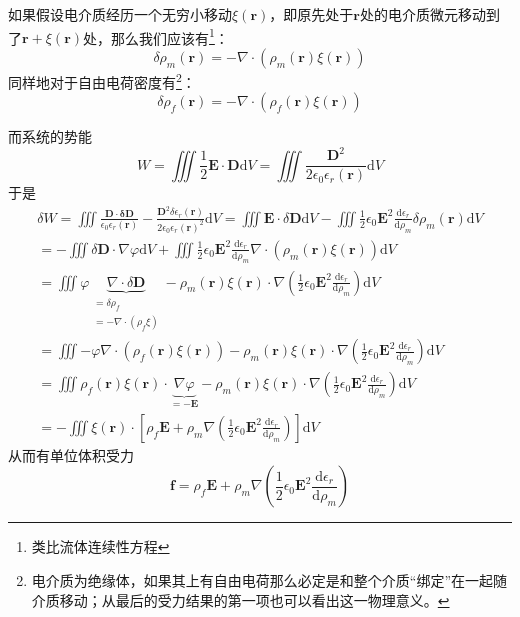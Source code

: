 \documentclass{ctexart}
\newcommand{\epsz}{\epsilon_0}
\newcommand{\epsr}{\epsilon_r}
\newcommand{\bfr}{\mathbf r}
\newcommand{\epsrr}{\epsr(\bfr)}
\newcommand{\epszr}{\epsz\epsrr}
\newcommand{\dd}[2]{\frac{\mathrm d #1}{\mathrm d #2}}
\begin{document}
	如果假设电介质经历一个无穷小移动$\xi(\mathbf r)$，即原先处于$\mathbf r$处的电介质微元移动到了$\mathbf r+\xi(\mathbf r)$处，那么我们应该有\footnote{类比流体连续性方程}：
	\begin{equation}
	\delta\rho_m(\bfr)=-\nabla\cdot(\rho_m(\bfr) \xi(\bfr))
	\end{equation}
	同样地对于自由电荷密度有\footnote{电介质为绝缘体，如果其上有自由电荷那么必定是和整个介质“绑定”在一起随介质移动；从最后的受力结果的第一项也可以看出这一物理意义。}：
	\begin{equation}
	\delta\rho_f(\bfr)=-\nabla\cdot(\rho_f(\bfr) \xi(\bfr))
	\end{equation}
	
	而系统的势能
	\begin{equation}
	W=\iiint \frac{1}{2}\mathbf E\cdot\mathbf D\mathrm dV=\iiint\frac{\mathbf D^2}{2\epszr}\mathrm dV
	\end{equation}
	于是
	\begin{multline}\label{F2W}
	\delta W=\iiint \frac{\mathbf D\cdot\mathbf\delta\mathbf D}{\epszr}-\frac{\mathbf D^2\delta\epsrr}{2\epsz\epsrr^2}\mathrm dV=\iiint\mathbf E\cdot\delta\mathbf D\mathrm dV-\iiint\frac{1}{2}\epsz\mathbf E^2\dd{\epsr}{\rho_m}\delta\rho_m(\bfr)\mathrm dV\\
	=-\iiint \delta\mathbf D\cdot\nabla\varphi\mathrm dV+\iiint \frac{1}{2}\epsz\mathbf E^2\dd{\epsr}{\rho_m}\nabla\cdot(\rho_m(\bfr)\xi(\bfr))\mathrm dV\\
	=\iiint\varphi\underbrace{\nabla\cdot\delta\mathbf D}_{\substack{=\delta\rho_f\\=-\nabla\cdot(\rho_f\xi)}}-\rho_m(\bfr)\xi(\bfr)\cdot\nabla\left(\frac{1}{2}\epsz\mathbf E^2\dd{\epsr}{\rho_m}\right)\mathrm dV\\
	=\iiint -\varphi\nabla\cdot(\rho_f(\bfr)\xi(\bfr))-\rho_m(\bfr)\xi(\bfr)\cdot\nabla\left(\frac{1}{2}\epsz\mathbf E^2\dd{\epsr}{\rho_m}\right)\mathrm dV\\
	=\iiint \rho_f(\bfr)\xi(\bfr)\cdot\underbrace{\nabla\varphi}_{=-\mathbf E}-\rho_m(\bfr)\xi(\bfr)\cdot\nabla\left(\frac{1}{2}\epsz\mathbf E^2\dd{\epsr}{\rho_m}\right)\mathrm dV\\
	=-\iiint \xi(\mathbf r)\cdot\left[\rho_f\mathbf E+\rho_m\nabla\left(\frac{1}{2}\epsz\mathbf E^2\dd{\epsr}{\rho_m}\right) \right]\mathrm dV
	\end{multline}
	从而有单位体积受力
	\begin{equation}\label{F2}
	\mathbf f=\rho_f\mathbf E+\rho_m\nabla\left(\frac{1}{2}\epsz\mathbf E^2\dd{\epsr}{\rho_m}\right)
	\end{equation}
	
\end{document}

